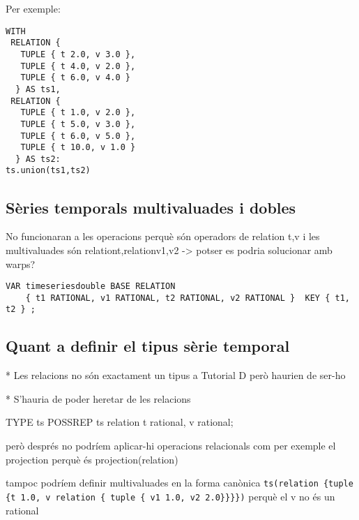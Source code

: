Per exemple:
\begin{verbatim}
WITH 
 RELATION {
   TUPLE { t 2.0, v 3.0 },
   TUPLE { t 4.0, v 2.0 },
   TUPLE { t 6.0, v 4.0 }
  } AS ts1,
 RELATION {
   TUPLE { t 1.0, v 2.0 },
   TUPLE { t 5.0, v 3.0 },
   TUPLE { t 6.0, v 5.0 },
   TUPLE { t 10.0, v 1.0 }
  } AS ts2: 
ts.union(ts1,ts2)
\end{verbatim}






\subsection{Sèries temporals multivaluades i dobles}


\todo{}

No funcionaran a les operacions perquè són operadors de relation {t,v} i les multivaluades són relation{t,relation{v1,v2}} -> potser es podria solucionar amb warps?


\begin{verbatim}
VAR timeseriesdouble BASE RELATION
    { t1 RATIONAL, v1 RATIONAL, t2 RATIONAL, v2 RATIONAL }  KEY { t1, t2 } ;
\end{verbatim}








\subsection{Quant a definir el tipus sèrie temporal}
\label{sec:implementacio:tipus-relacional}

\todo{}

* Les relacions no són exactament un tipus a Tutorial D però haurien de ser-ho

* S'hauria de poder heretar de les relacions




TYPE ts POSSREP {ts relation {t rational, v rational}};

però després no podríem aplicar-hi operacions relacionals com per exemple el projection perquè és projection(relation)

tampoc podríem definir multivaluades en la forma canònica \verb+ts(relation {tuple {t 1.0, v relation { tuple { v1 1.0, v2 2.0}}}})+ perquè el v no és un rational






